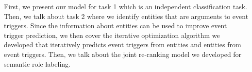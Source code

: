 First, we present our model for task 1 which is an independent classification task. Then, we talk about task 2 where we identify entities that are arguments to event triggers. Since the information about entities can be used to improve event trigger prediction, we then cover the iterative optimization algorithm we developed that iteratively predicts event triggers from entities and entities from event triggers. Then, we talk about the joint re-ranking model we developed for semantic role labeling.